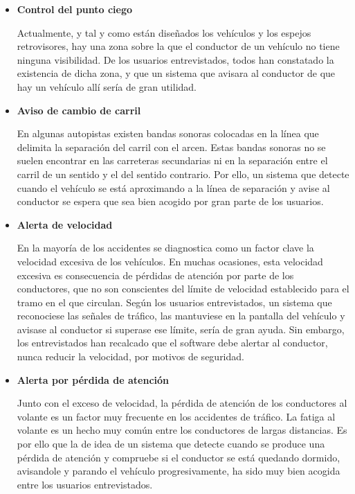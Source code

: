 \begin{itemize}[-]
\item \textbf{Control del punto ciego}
\par Actualmente, y tal y como están diseñados los vehículos y los espejos retrovisores, hay una zona sobre la que el conductor de un vehículo no tiene ninguna visibilidad. De los usuarios entrevistados, todos han constatado la existencia de dicha zona, y que un sistema que avisara al conductor de que hay un vehículo allí sería de gran utilidad.

\item \textbf{Aviso de cambio de carril}
\par En algunas autopistas existen bandas sonoras colocadas en la línea que delimita la separación del carril con el arcen. Estas bandas sonoras no se suelen encontrar en las carreteras secundarias ni en la separación entre el carril de un sentido y el del sentido contrario.  Por ello, un sistema que detecte cuando el vehículo se está aproximando a la línea de separación y avise al conductor se espera que sea bien acogido por gran parte de los usuarios.

\item \textbf{Alerta de velocidad}
\par En la mayoría de los accidentes se diagnostica como un factor clave la velocidad excesiva de los vehículos. En muchas ocasiones, esta velocidad excesiva es consecuencia de pérdidas de atención por parte de los conductores, que no son conscientes del límite de velocidad establecido para el tramo en el que circulan. Según los usuarios entrevistados, un sistema que reconociese las señales de tráfico, las mantuviese en la pantalla del vehículo y avisase al conductor si superase ese límite, sería de gran ayuda. Sin embargo, los entrevistados han recalcado que el software debe alertar al conductor, nunca reducir la velocidad, por motivos de seguridad.

\item \textbf{Alerta por pérdida de atención}
\par Junto con el exceso de velocidad, la pérdida de atención de los conductores al volante es un factor muy frecuente en los accidentes de tráfico. La fatiga al volante es un hecho muy común entre los conductores de largas distancias. Es por ello que la de idea de un sistema que detecte cuando se produce una pérdida de atención y compruebe si el conductor se está quedando dormido, avisandole y parando el vehículo progresivamente, ha sido muy bien acogida entre los usuarios entrevistados.


\end{itemize}
